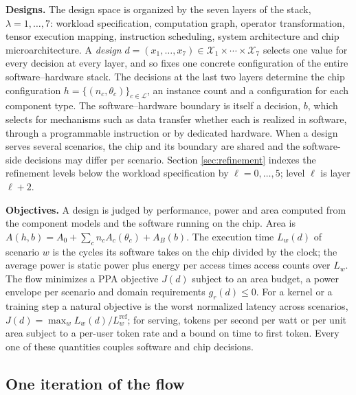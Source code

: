 \documentclass[11pt]{article}
\begin{document}
\textbf{Designs.} The design space is organized by the seven layers of the stack, \(\lambda=1,\dots,7\): workload specification, computation graph, operator transformation, tensor execution mapping, instruction scheduling, system architecture and chip microarchitecture. A \emph{design} \(d=(x_1,\dots,x_7)\in\mathcal X_1\times\cdots\times\mathcal X_7\) selects one value for every decision at every layer, and so fixes one concrete configuration of the entire software--hardware stack. The decisions at the last two layers determine the chip configuration \(h=\{(n_c,\theta_c)\}_{c\in\mathcal L}\), an instance count and a configuration for each component type. The software--hardware boundary is itself a decision, \(b\), which selects for mechanisms such as data transfer whether each is realized in software, through a programmable instruction or by dedicated hardware. When a design serves several scenarios, the chip and its boundary are shared and the software-side decisions may differ per scenario. Section \ref{sec:refinement} indexes the refinement levels below the workload specification by \(\ell=0,\dots,5\); level \(\ell\) is layer \(\ell+2\).

\textbf{Objectives.} A design is judged by performance, power and area computed from the component models and the software running on the chip. Area is \(A(h,b)=A_0+\sum_c n_c A_c(\theta_c)+A_B(b)\). The execution time \(L_w(d)\) of scenario \(w\) is the cycles its software takes on the chip divided by the clock; the average power is static power plus energy per access times access counts over \(L_w\). The flow minimizes a PPA objective \(J(d)\) subject to an area budget, a power envelope per scenario and domain requirements \(g_r(d)\le 0\). For a kernel or a training step a natural objective is the worst normalized latency across scenarios, \(J(d)=\max_w L_w(d)/L_w^{\mathrm{ref}}\); for serving, tokens per second per watt or per unit area subject to a per-user token rate and a bound on time to first token. Every one of these quantities couples software and chip decisions.

\subsection{One iteration of the flow}\label{sec:iteration}
\end{document}
